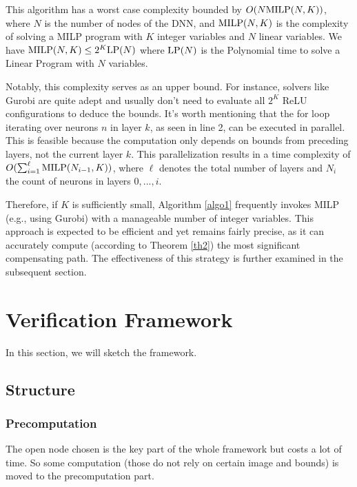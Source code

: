 This algorithm has a worst case complexity bounded by $O(N {\textrm{MILP}}(N,K))$, 
where $N$ is the number of nodes of the DNN, 
and ${\textrm{MILP}}(N,K)$ is the complexity of solving a MILP program with $K$ integer variables and $N$ linear variables.
We have ${\textrm{MILP}}(N,K) \leq 2^K {\textrm{LP}}(N)$ where ${\textrm{LP}}(N)$ is the Polynomial time to solve a Linear Program with $N$ variables.

Notably, this complexity serves as an upper bound. For instance, solvers like Gurobi are quite adept and usually don't need to evaluate all $2^K$ ReLU configurations to deduce the bounds.
It's worth mentioning that the for loop iterating over neurons $n$ in layer $k$, as seen in line 2, can be executed in parallel. This is feasible because the computation only depends on bounds from preceding layers, not the current layer $k$. This parallelization results in a time complexity of $O(\sum_{i=1}^{\ell} {\textrm{MILP}}(N_{i-1},K))$, where $\ell$ denotes the total number of layers and $N_i$ the count of neurons in layers $0, ..., i$.


Therefore, if $K$ is sufficiently small, Algorithm \ref{algo1} frequently invokes MILP (e.g., using Gurobi) with a manageable number of integer variables. This approach is expected to be efficient and yet remains fairly precise, as it can accurately compute (according to Theorem \ref{th2}) the most significant compensating path. The effectiveness of this strategy is further examined in the subsequent section.



\iffalse
\section{Verification Framework}




In this section, we will sketch the framework. 

\subsection{Structure}

\subsubsection*{Precomputation}

The open node chosen is the key part of the whole framework but costs a lot of time. So some computation (those do not rely on certain image and bounds) is moved to the precomputation part.

